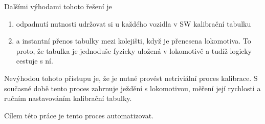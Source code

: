 Dalšími výhodami tohoto řešení je

\begin{enumerate}
	\item odpadnutí nutnosti udržovat si u každého vozidla v SW kalibrační
	tabulku
	\item a instantní přenos tabulky mezi kolejišti, když je přenesena
	lokomotiva. To proto, že tabulka je jednoduše fyzicky uložená v lokomotivě a
	tudíž logicky cestuje s ní.
\end{enumerate}

Nevýhodou tohoto přístupu je, že je nutné provést netriviální proces kalibrace.
S současné době tento proces zahrnuje ježdění s lokomotivou, měření její
rychlosti a ručním nastavováním kalibrační tabulky.

Cílem této práce je tento proces automatizovat.


